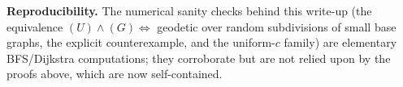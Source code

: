 \documentclass{amsart}
\theoremstyle{definition}
\begin{document}
\noindent\textbf{Reproducibility.} The numerical sanity checks behind this write-up
(the equivalence $(U)\wedge(G)\Leftrightarrow$ geodetic over random subdivisions
of small base graphs, the explicit counterexample, and the uniform-$c$ family)
are elementary BFS/Dijkstra computations; they corroborate but are not relied upon
by the proofs above, which are now self-contained.
\end{document}
